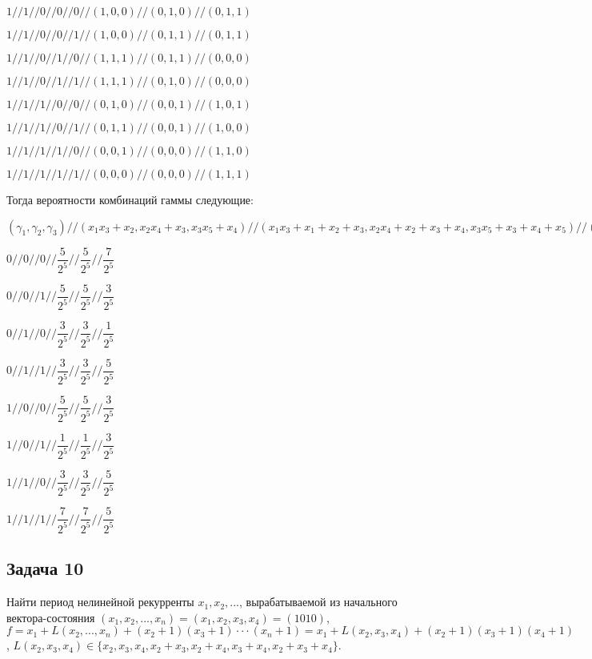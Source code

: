 \documentclass[12pt]{extarticle}
\begin{document}
$1 // 1 // 0 // 0 // 0 // (1,0,0) // (0,1,0) // (0,1,1)$

$1 // 1 // 0 // 0 // 1 // (1,0,0) // (0,1,1) // (0,1,1)$

$1 // 1 // 0 // 1 // 0 // (1,1,1) // (0,1,1) // (0,0,0)$

$1 // 1 // 0 // 1 // 1 // (1,1,1) // (0,1,0) // (0,0,0)$

$1 // 1 // 1 // 0 // 0 // (0,1,0) // (0,0,1) // (1,0,1)$

$1 // 1 // 1 // 0 // 1 // (0,1,1) // (0,0,1) // (1,0,0)$

$1 // 1 // 1 // 1 // 0 // (0,0,1) // (0,0,0) // (1,1,0)$

$1 // 1 // 1 // 1 // 1 // (0,0,0) // (0,0,0) // (1,1,1)$

Тогда вероятности комбинаций гаммы следующие:

$(\gamma_1,\gamma_2,\gamma_3)// (x_1 x_3 + x_2, x_2 x_4 + x_3, x_3 x_5 + x_4) // (x_1 x_3+x_1+x_2+x_3, x_2 x_4+x_2+x_3+x_4, x_3 x_5+x_3+x_4+x_5) // (x_1 x_3+x_2+1, x_2 x_4+x_3+1, x_3 x_5+x_4+1)$

$0//0//0//\dfrac{5}{2^5}//\dfrac{5}{2^5}//\dfrac{7}{2^5}$

$0//0//1//\dfrac{5}{2^5}//\dfrac{5}{2^5}//\dfrac{3}{2^5}$

$0//1//0//\dfrac{3}{2^5}//\dfrac{3}{2^5}//\dfrac{1}{2^5}$

$0//1//1//\dfrac{3}{2^5}//\dfrac{3}{2^5}//\dfrac{5}{2^5}$

$1//0//0//\dfrac{5}{2^5}//\dfrac{5}{2^5}//\dfrac{3}{2^5}$

$1//0//1//\dfrac{1}{2^5}//\dfrac{1}{2^5}//\dfrac{3}{2^5}$

$1//1//0//\dfrac{3}{2^5}//\dfrac{3}{2^5}//\dfrac{5}{2^5}$

$1//1//1//\dfrac{7}{2^5}//\dfrac{7}{2^5}//\dfrac{5}{2^5}$

\subsection{Задача 10}
Найти период нелинейной рекурренты $x_1,x_2,...$, вырабатываемой из начального вектора-состояния $(x_1,x_2,...,x_n)= (x_1,x_2,x_3,x_4)=(1010)$, $f=x_1+L(x_2,...,x_n)+(x_2+1)(x_3+1)\cdot\cdot\cdot(x_n+1) = x_1+ L(x_2,x_3,x_4)+(x_2+1)(x_3+1)(x_4+1)$, $L(x_2,x_3,x_4)\in\{x_2,x_3,x_4,x_2+x_3,x_2+x_4,x_3+x_4,x_2+x_3+x_4\}$.
\end{document}
